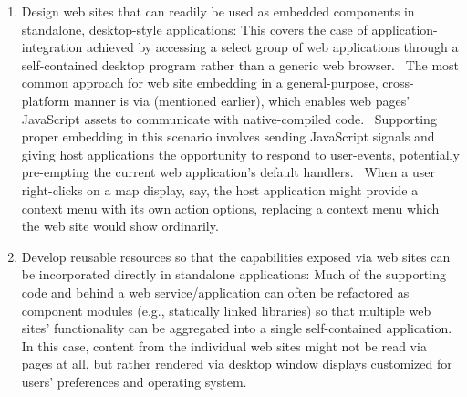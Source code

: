 \documentclass[10.5pt]{article}
\begin{document}
{{\begin{enumerate}[leftmargin=3pt, itemsep=1pt]
\item{} Design web sites that can readily be used as embedded components in standalone, desktop-style applications: This covers the case of application-integration achieved by accessing a select group of web applications through a self-contained desktop program rather than a generic web browser.  The most common approach for web site embedding in a general-purpose, cross-platform manner is via  (mentioned earlier), which enables web pages' JavaScript assets to communicate with native-compiled code.  Supporting proper embedding in this scenario involves sending JavaScript signals and giving host applications the opportunity to respond to user-events, potentially pre-empting the current web application's default handlers.  When a user right-clicks on a map display, say, the host application might provide a context menu with its own action options, replacing a context menu which the web site would show ordinarily.

\item{} Develop reusable resources so that the capabilities exposed via web sites can be incorporated directly in standalone applications: Much of the supporting code and  behind a web service/application can often be refactored as component modules (e.g., statically linked libraries) so that multiple web sites' functionality can be aggregated into a single self-contained application.  In this case, content from the individual web sites might not be read via \HTML{} pages at all, but rather rendered via desktop window displays customized for users' preferences and operating system.

\end{enumerate}
}

}
\end{document}
